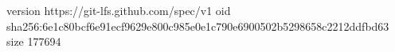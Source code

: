 version https://git-lfs.github.com/spec/v1
oid sha256:6e1c80bcf6e91ecf9629e800c985e0e1c790e6900502b5298658c2212ddfbd63
size 177694
